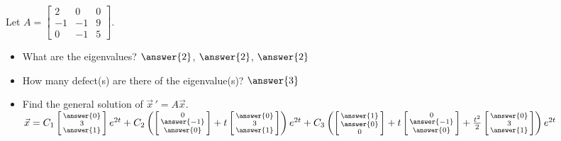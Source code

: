 \documentclass{ximera}
\begin{document}
\begin{exercise}%
    Let $A = \left[ 
        \begin{smallmatrix}
            2 & 0 & 0 \\
            -1 & -1 & 9 \\
            0 & -1 & 5
        \end{smallmatrix}
    \right]$.  
    \begin{itemize}
        \item What are the eigenvalues? $\answer{2}$, $\answer{2}$, $\answer{2}$
        \item How many defect(s) are there of the eigenvalue(s)? $\answer{3}$
        \item Find the general solution of $\vec{x}\,' = A\vec{x}$.\\
        $\vec{x} =
        C_1
        \left[ \begin{smallmatrix}
            \answer{0} \\ 3 \\ \answer{1}
        \end{smallmatrix}\right]
        e^{2t} + C_2
        \left(
            \left[ \begin{smallmatrix}
                0 \\ \answer{-1} \\ \answer{0}
            \end{smallmatrix}\right]
            + t
            \left[ \begin{smallmatrix}
                \answer{0} \\ 3 \\ \answer{1}
            \end{smallmatrix}\right]
        \right)
        e^{2t} + C_3
        \left(
            \left[ \begin{smallmatrix}
                \answer{1} \\ \answer{0} \\ 0
            \end{smallmatrix}\right]
            + t
            \left[ \begin{smallmatrix}
                0 \\ \answer{-1} \\ \answer{0}
            \end{smallmatrix}\right]
            + \frac{t^2}{2}
            \left[ \begin{smallmatrix}
                \answer{0} \\ 3 \\ \answer{1}
            \end{smallmatrix}\right]
        \right)
        e^{2t}$
    \end{itemize}
\end{exercise}
\end{document}
